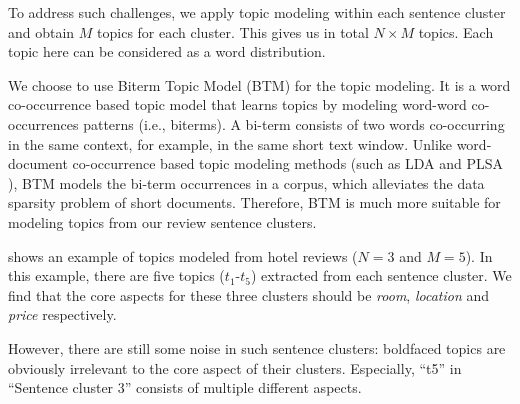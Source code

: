 
To address such challenges,
we apply topic modeling within each sentence cluster and obtain $M$ topics for each cluster. 
This gives us in total $N\times M$ topics.
Each topic here can be considered as a word distribution.

We choose to use Biterm Topic Model (BTM) \cite{cheng2014btm} for the topic modeling.
It is a word co-occurrence based topic model that learns topics by modeling word-word co-occurrences patterns (i.e., biterms). 
A bi-term consists of two words co-occurring in the same context, for example, in the same short text window.
Unlike word-document co-occurrence based topic modeling methods (such as LDA \cite{Blei2003LatentDA} and PLSA \cite{Hofmann1999ProbabilisticLS,Hofmann2001UnsupervisedLB}), 
BTM models the bi-term occurrences in a corpus, which alleviates the data sparsity problem of short documents.
Therefore, BTM is much more suitable for modeling topics from our review sentence clusters.


 shows an example of topics modeled from hotel reviews ($N=3$  and $M=5$).
In this example, there are five topics ($t_1$-$t_5$) extracted from each sentence cluster. 
We find that the core aspects for these 
three clusters should be {\em room}, {\em location} and {\em price} 
respectively.

However, there are still some noise in such sentence clusters:
boldfaced topics are obviously irrelevant to the core aspect of their clusters.  
Especially, ``t5'' in ``Sentence cluster 3'' consists of multiple different aspects.

